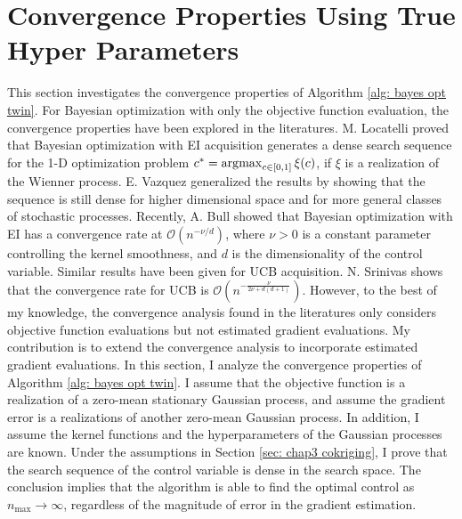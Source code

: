 \section{Convergence Properties Using True Hyper Parameters}
\label{sec: chap3 convergence}
This section investigates the convergence properties 
of Algorithm \ref{alg: bayes opt twin}.
For Bayesian optimization with only the 
objective function evaluation, the convergence properties have been explored in the literatures.
M. Locatelli \cite{Locatelli} proved that Bayesian optimization with EI acquisition
generates a dense search sequence 
for the 1-D optimization problem 
$c^*=\operatorname*{\arg\!\max}_{c\in[0,1]} \xi(c)$, if $\xi$ is a realization of the Wienner process.
E. Vazquez \cite{convergen EI} generalized the results by showing that the sequence is still dense
for higher dimensional space and for more general classes of stochastic processes.
Recently, A. Bull \cite{converge Bull} showed that Bayesian optimization with EI
has a convergence rate at
$\mathcal{O}(n^{-\nu/d})$,
where $\nu>0$ is a constant parameter controlling the kernel smoothness, and $d$
is the dimensionality of the control variable. 
Similar results have been given for UCB acquisition. 
N. Srinivas \cite{GP bandit} shows that the convergence rate for UCB is
$\mathcal{O}(n^{- \frac{\nu}{2\nu+d(d+1)}})$.
However, to the best of my knowledge, the convergence analysis found in the literatures
only considers objective function evaluations but not estimated gradient evaluations.
My contribution is to
extend the convergence analysis to incorporate estimated gradient evaluations.
In this section, I analyze the convergence properties of Algorithm \ref{alg: bayes opt twin}.
I assume that the objective function is a realization of a zero-mean stationary Gaussian process,
and assume the gradient error is a realizations of another zero-mean
Gaussian process. In addition, I assume the kernel functions and the hyperparameters
of the Gaussian processes are known.
Under the assumptions in Section \ref{sec: chap3 cokriging}, I prove that
the search sequence of the control variable is dense in the search space.
The conclusion implies that the algorithm is able to find the optimal control
as $n_{\max}\rightarrow \infty$, regardless
of the magnitude of error in the gradient estimation.\\


